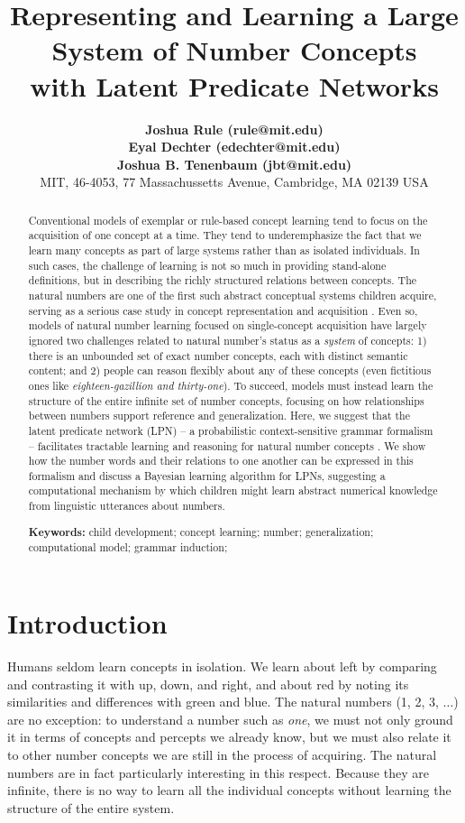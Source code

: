 \documentclass[10pt,letterpaper]{article}
\title{Representing and Learning a Large System of Number Concepts \\ with Latent Predicate Networks}
\author{
  {\large \bf Joshua Rule (rule@mit.edu)}\\
  {\large \bf Eyal Dechter (edechter@mit.edu)}\\
  {\large \bf Joshua B. Tenenbaum (jbt@mit.edu)}\\
  MIT, 46-4053, 77 Massachussetts Avenue, Cambridge, MA 02139 USA}
\begin{document}
\maketitle

\begin{abstract}
  Conventional models of exemplar or rule-based concept learning tend
  to focus on the acquisition of one concept at a time. They tend to
  underemphasize the fact that we learn many concepts as part of large
  systems rather than as isolated individuals. In such cases, the
  challenge of learning is not so much in providing stand-alone
  definitions, but in describing the richly structured relations
  between concepts. The natural numbers are one of the first such
  abstract conceptual systems children acquire, serving as a serious
  case study in concept representation and acquisition
  \citep{fuson1988children,galGel2005,Car2009}. Even so, models of
  natural number learning focused on single-concept acquisition have
  largely ignored two challenges related to natural number's status as
  a \emph{system} of concepts: 1) there is an unbounded set of exact
  number concepts, each with distinct semantic content; and 2) people
  can reason flexibly about any of these concepts (even fictitious
  ones like \emph{eighteen-gazillion and thirty-one}). To succeed,
  models must instead learn the structure of the entire infinite set
  of number concepts, focusing on how relationships between numbers
  support reference and generalization.  Here, we suggest that the
  latent predicate network (LPN) -- a probabilistic context-sensitive
  grammar formalism -- facilitates tractable learning and reasoning
  for natural number concepts \citep{DecRulTen2015}. We show how the
  number words and their relations to one another can be expressed in
  this formalism and discuss a Bayesian learning algorithm for LPNs,
  suggesting a computational mechanism by which children might learn
  abstract numerical knowledge from linguistic utterances about
  numbers.

  \textbf{Keywords:}
  child development; concept learning; number; generalization;
  computational model; grammar induction;
\end{abstract}

\section{Introduction}

Humans seldom learn concepts in isolation. We learn about left by
comparing and contrasting it with up, down, and right, and about red
by noting its similarities and differences with green and blue. The
natural numbers (1, 2, 3, $\ldots$) are no exception: to understand a
number such as \emph{one}, we must not only ground it in terms of
concepts and percepts we already know, but we must also relate it to
other number concepts we are still in the process of acquiring. The
natural numbers are in fact particularly interesting in this respect.
Because they are infinite, there is no way to learn all the individual
concepts without learning the structure of the entire system.
\end{document}
